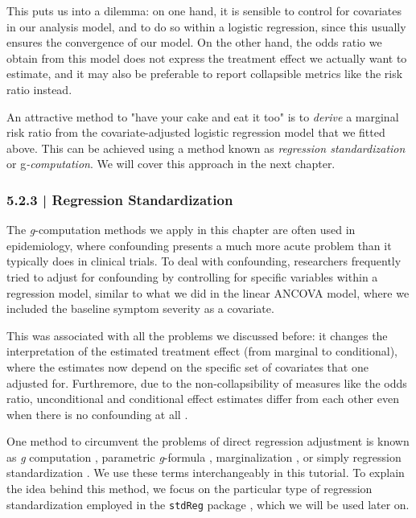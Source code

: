 This puts us into a dilemma: on one hand, it is sensible to control for covariates in our analysis model, and to do so within a logistic regression, since this usually ensures the convergence of our model. On the other hand, the odds ratio we obtain from this model does not express the treatment effect we actually want to estimate, and it may also be preferable to report collapsible metrics like the risk ratio instead. 

An attractive method to "have your cake and eat it too" is to \emph{derive} a marginal risk ratio from the covariate-adjusted logistic regression model that we fitted above. This can be achieved using a method known as \emph{regression standardization} or g\emph{-computation}. We will cover this approach in the next chapter.

\subsubsection{{\normalfont\textsf{\textcolor{sBlue}{\small 5.2.3 |}}} Regression Standardization}

The \emph{g}-computation methods we apply in this chapter are often used in epidemiology, where confounding presents a much more acute problem than it typically does in clinical trials. To deal with confounding, researchers frequently tried to adjust for confounding by controlling for specific variables within a regression model, similar to what we did in the linear ANCOVA model, where we included the baseline symptom severity as a covariate. 

This was associated with all the problems we discussed before: it changes the interpretation of the estimated treatment effect (from marginal to conditional), where the estimates now depend on the specific set of covariates that one adjusted for. Furthremore, due to the non-collapsibility of measures like the odds ratio, unconditional and conditional effect estimates differ from each other even when there is no confounding at all \citep{vansteelandt2011invited}. 

One method to circumvent the problems of direct regression adjustment is known as \emph{g} computation \citep{robins1986new}, parametric \emph{g}-formula \citep{naimi2017introduction}, marginalization \citep{morris2022planning}, or simply regression standardization \citep{vansteelandt2011invited}. We use these terms interchangeably in this tutorial. To explain the idea behind this method, we focus on the particular type of regression standardization employed in the \texttt{stdReg} package \citep{stdreg}, which we will be used later on.

